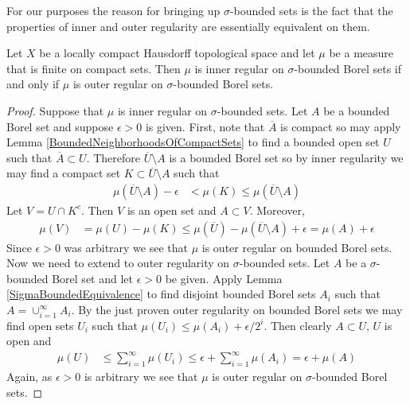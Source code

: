 For our purposes the reason for bringing up $\sigma$-bounded sets is
the fact that the properties of inner and outer regularity are
essentially equivalent on them.

\begin{lem}\label{InnerOuterRegularityEquivalence}Let $X$ be a locally compact Hausdorff topological space and let $\mu$ be a measure
  that is finite on compact sets.  Then $\mu$ is inner regular on
  $\sigma$-bounded Borel sets if and only if $\mu$ is outer regular on
  $\sigma$-bounded Borel sets.
\end{lem}
\begin{proof}
Suppose that $\mu$ is inner regular on $\sigma$-bounded sets.  Let $A$
be a bounded Borel set and suppose $\epsilon > 0$ is given.   First,
note that $\overline{A}$ is compact so may apply
Lemma \ref{BoundedNeighborhoodsOfCompactSets} to find a bounded
open set $U$ such that $\overline{A} \subset U$.  Therefore
$\overline{U} \setminus A$ is a bounded Borel set so by inner
regularity we may find a
compact set $K \subset \overline{U} \setminus A$ such that 
\begin{align*}
\mu(\overline{U} \setminus A) - \epsilon &< \mu(K) \leq \mu(\overline{U} \setminus A)
\end{align*}
Let $V = U \cap K^c$.  Then $V$ is an open set and $A \subset V$.
Moreover,
\begin{align*}
\mu(V) &= \mu(U) - \mu(K) \leq \mu(\overline{U}) - \mu(\overline{U}
\setminus A) + \epsilon = \mu(A) + \epsilon
\end{align*}
Since $\epsilon > 0$ was arbitrary we see that $\mu$ is outer regular
on bounded Borel sets.  Now we need to extend to outer regularity on
$\sigma$-bounded sets.  Let $A$ be a $\sigma$-bounded Borel set and
let $\epsilon > 0$ be given.  Apply Lemma
\ref{SigmaBoundedEquivalence}
to find disjoint bounded Borel sets $A_i$ such that $A = \cup_{i=1}^\infty
A_i$.  By the just proven outer regularity on bounded Borel sets we
may find open sets $U_i$ such that $\mu(U_i) \leq \mu(A_i) +
\epsilon/2^i$.  Then clearly $A \subset U$, $U$ is open and 
\begin{align*}
\mu(U) &\leq \sum_{i=1}^\infty \mu(U_i) \leq \epsilon + \sum_{i=1}^\infty
\mu(A_i)  = \epsilon + \mu(A)
\end{align*}
Again, as $\epsilon > 0$ is arbitrary we see that $\mu$ is outer
regular on $\sigma$-bounded Borel sets.


\end{proof}
